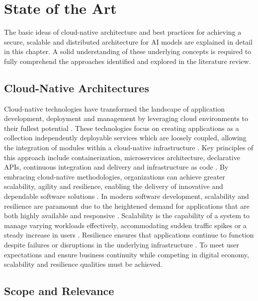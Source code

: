 
\chapter{State of the Art}

The basic ideas of cloud-native architecture and best practices for achieving a secure, scalable and distributed architecture for AI models are explained in detail in this chapter. A solid understanding of these underlying concepts is required to fully comprehend the approaches identified and explored in the literature review.

\section{Cloud-Native Architectures}

Cloud-native technologies have transformed the landscape of application development, deployment and management by leveraging cloud environments to their fullest potential \cite{r9}. These technologies focus on creating applications as a collection independently deployable services which are loosely coupled, allowing the integration of modules within a cloud-native infrastructure \cite{r10}. Key principles of this approach include containerization, microservices architecture, declarative APIs, continuous integration and delivery  and infrastructure as code  \cite{r11}. By embracing cloud-native methodologies, organizations can achieve greater scalability, agility and resilience, enabling the delivery of innovative and dependable software solutions \cite{r12}. In modern software development, scalability and resilience are paramount due to the heightened demand for applications that are both highly available and responsive \cite{r13}. Scalability is the capability of a system to manage varying workloads effectively, accommodating sudden traffic spikes or a steady increase in users \cite{r14}. Resilience ensures that applications continue to function despite failures or disruptions in the underlying infrastructure \cite{r15}. To meet user expectations and ensure business continuity while competing in digital economy, scalability and resilience qualities must be achieved.



\section{Scope and Relevance}

